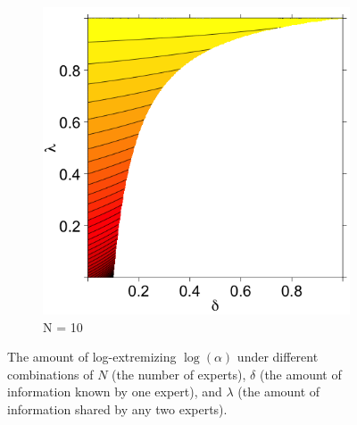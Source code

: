 \documentclass[11pt]{article}
\theoremstyle{definition}
\theoremstyle{definition}
\begin{document}
\begin{figure}
\begin{subfigure}[b]{0.49\textwidth}
                \includegraphics[width=\textwidth]{ExtremeN10}
\caption{N = 10}
\label{ExtremeN10}
        \end{subfigure}
        \caption{ The amount of log-extremizing $\log(\alpha)$ under different combinations of $N$ (the number of experts), $\delta$ (the amount of information known by one expert), and $\lambda$ (the amount of information shared by any two experts).}
        \label{Levelplots}
\end{figure}
\end{document}
